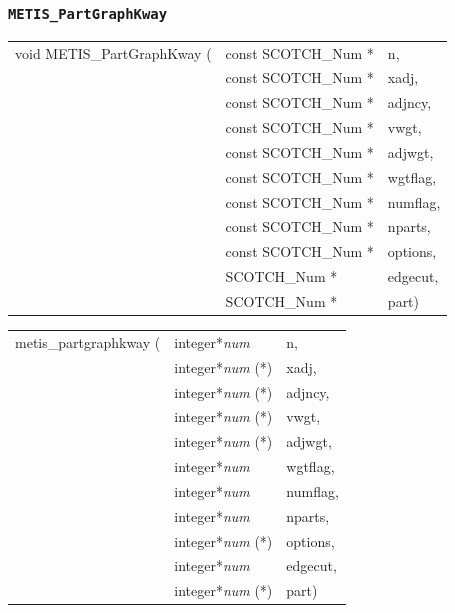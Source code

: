 \subsubsection{{\tt METIS\_PartGraphKway}}

\begin{itemize}
\progsyn

{\tt\begin{tabular}{l@{}ll}
void METIS\_PartGraphKway ( & const SCOTCH\_Num * & n,       \\
                            & const SCOTCH\_Num * & xadj,    \\
                            & const SCOTCH\_Num * & adjncy,  \\
                            & const SCOTCH\_Num * & vwgt,    \\
                            & const SCOTCH\_Num * & adjwgt,  \\
                            & const SCOTCH\_Num * & wgtflag, \\
                            & const SCOTCH\_Num * & numflag, \\
                            & const SCOTCH\_Num * & nparts,  \\
                            & const SCOTCH\_Num * & options, \\
                            & SCOTCH\_Num *       & edgecut, \\
                            & SCOTCH\_Num *       & part)
\end{tabular}}

{\tt\begin{tabular}{l@{}ll}
metis\_partgraphkway ( & integer*{\it num}     & n,       \\
                       & integer*{\it num} (*) & xadj,    \\
                       & integer*{\it num} (*) & adjncy,  \\
                       & integer*{\it num} (*) & vwgt,    \\
                       & integer*{\it num} (*) & adjwgt,  \\
                       & integer*{\it num}     & wgtflag, \\
                       & integer*{\it num}     & numflag, \\
                       & integer*{\it num}     & nparts,  \\
                       & integer*{\it num} (*) & options, \\
                       & integer*{\it num}     & edgecut, \\
                       & integer*{\it num} (*) & part)
\end{tabular}}


\end{itemize}
